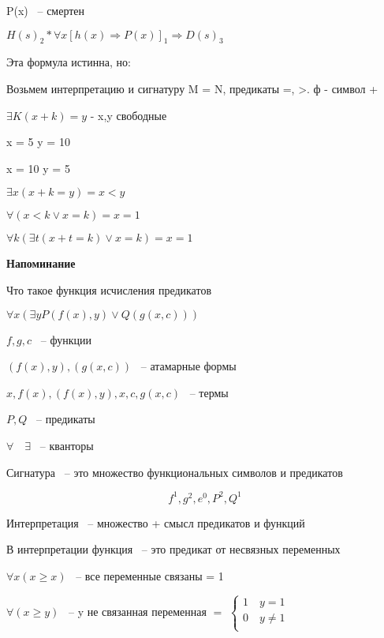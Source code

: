 \documentclass[russian]{lecture-notes}
\begin{document}
    P(x) ~-- смертен

    $H(s)_{2} * \forall x [ h(x) \Rightarrow P(x)  ]_{1} \Rightarrow D(s)_{3}$

    Эта формула истинна, но:

    Возьмем интерпретацию и сигнатуру M = N, предикаты =, >. ф - символ +

    $\exists K (x + k) = y$ - x,y свободные

    x = 5 \qquad y = 10 

    x = 10 \qquad y = 5 

    $\exists x (x+k=y) = x <y$

    $\forall (x < k \lor x = k) = x = 1$

    $\forall k (\exists t(x+t=k) \lor x = k) =x = 1 $


    \textbf{Напоминание}

    Что такое функция исчисления предикатов

    $\forall x (\exists y P(f(x), y) \lor Q(g(x, c)))$

    $f, g, c$ ~-- функции

    $(f(x), y), (g(x, c))$ ~-- атамарные формы

    $x, f(x), (f(x),y), x, c, g(x, c)$ ~-- термы

    $P, Q$ ~-- предикаты

    $\forall \quad \exists$ ~-- кванторы

    \begin{definition}
        Сигнатура ~-- это множество функциональных символов и предикатов

        $${ f^1, g^2, e^0, P^2, Q^1}$$
    \end{definition}

    \begin{definition}
        Интерпретация ~-- множество + смысл предикатов и функций
    \end{definition}

    В интерпретации функция ~-- это предикат от несвязных переменных


    $\forall x (x \geq x)$ ~-- все переменные связаны = 1

    $\forall (x \geq y)$ ~-- y не связанная переменная $=$
    $\left \{
    \begin{gathered}
        1 \quad y = 1  \\
        0 \quad y \neq 1 \\
    \end{gathered}
    \right.$
\end{document}
